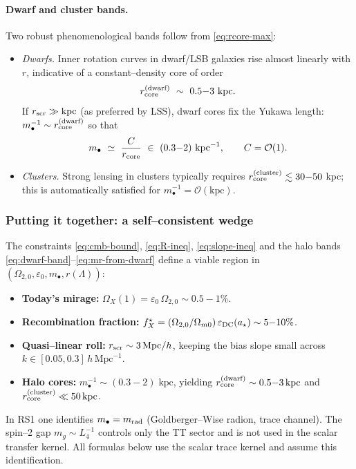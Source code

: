 \documentclass[10pt]{article}
\theoremstyle{definition}
\theoremstyle{plain}
\begin{document}
\paragraph{Dwarf and cluster bands.}\label{par:uom-main-178}
Two robust phenomenological bands follow from \eqref{eq:rcore-max}:
\begin{itemize}[leftmargin=1.6em]
\item \emph{Dwarfs.} Inner rotation curves in dwarf/LSB galaxies rise almost linearly with $r$, indicative of a constant–density core of order
\begin{equation}\label{eq:dwarf-band}
r_{\rm core}^{\rm (dwarf)}\ \sim\ 0.5{-}3\ \mathrm{kpc}.
\end{equation}
If $r_{\rm scr}\gg \mathrm{kpc}$ (as preferred by LSS), dwarf cores fix the Yukawa length: $m_\bullet^{-1}\sim r_{\rm core}^{\rm (dwarf)}$ so that
\begin{equation}\label{eq:mr-from-dwarf}
m_\bullet\ \simeq\ \frac{C}{r_{\rm core}}\ \in\ (0.3{-}2)\ \mathrm{kpc}^{-1},\qquad C=\mathcal O(1).
\end{equation}
\item \emph{Clusters.} Strong lensing in clusters typically requires $r_{\rm core}^{\rm (cluster)}\lesssim 30{-}50$ kpc; this is automatically satisfied for $m_\bullet^{-1}=\mathcal O(\mathrm{kpc})$.
\end{itemize}

\subsubsection*{Putting it together: a self–consistent wedge}\label{subsubsec:uom-main-020}

The constraints \eqref{eq:cmb-bound}, \eqref{eq:R-ineq}, \eqref{eq:slope-ineq} and the halo bands
\eqref{eq:dwarf-band}–\eqref{eq:mr-from-dwarf} define a viable region in
$(\Omega_{2,0},\varepsilon_0,m_\bullet,r(\Lambda))$:
\begin{itemize}[leftmargin=1.6em]
\item \textbf{Today’s mirage:} $\Omega_X(1)=\varepsilon_0\,\Omega_{2,0}\sim 0.5{-}1\%$.
\item \textbf{Recombination fraction:} $f_X^\star=(\Omega_{2,0}/\Omega_{m0})\,\varepsilon_{\rm DC}(a_\star)\sim 5{-}10\%$.
\item \textbf{Quasi–linear roll:} $r_{\rm scr}\sim 3\,\mathrm{Mpc}/h$, keeping the bias slope small across $k\in[0.05,0.3]\,h\,\mathrm{Mpc}^{-1}$.
\item \textbf{Halo cores:} $m_\bullet^{-1}\sim (0.3-2)\; \mathrm{kpc}$, yielding $r_{\rm core}^{\rm (dwarf)}\sim 0.5{-}3\,\mathrm{kpc}$ and $r_{\rm core}^{\rm (cluster)}\ll 50\,\mathrm{kpc}$.
\end{itemize}
In RS1 one identifies $m_\bullet=m_{\rm rad}$ (Goldberger--Wise radion, trace channel). The spin--2 gap
$m_g\sim L_4^{-1}$ controls only the TT sector and is not used in the scalar transfer kernel.
All formulas below use the scalar trace kernel and assume this identification.
\end{document}
